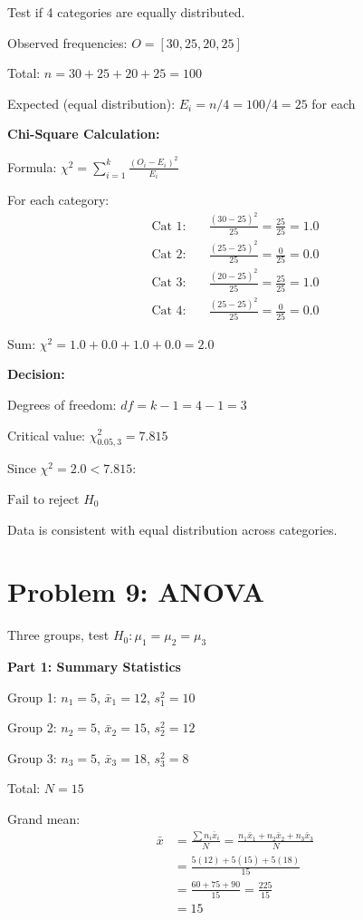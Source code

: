 \documentclass[10pt,twocolumn]{article}
\begin{document}
Test if 4 categories are equally distributed.

Observed frequencies: $O = [30, 25, 20, 25]$

Total: $n = 30+25+20+25 = 100$

Expected (equal distribution): $E_i = n/4 = 100/4 = 25$ for each

\textbf{Chi-Square Calculation:}

Formula: $\chi^2 = \sum_{i=1}^{k} \frac{(O_i - E_i)^2}{E_i}$

For each category:
\begin{align*}
\text{Cat 1:} \quad &\frac{(30-25)^2}{25} = \frac{25}{25} = 1.0 \\
\text{Cat 2:} \quad &\frac{(25-25)^2}{25} = \frac{0}{25} = 0.0 \\
\text{Cat 3:} \quad &\frac{(20-25)^2}{25} = \frac{25}{25} = 1.0 \\
\text{Cat 4:} \quad &\frac{(25-25)^2}{25} = \frac{0}{25} = 0.0
\end{align*}

Sum: $\chi^2 = 1.0 + 0.0 + 1.0 + 0.0 = \boxed{2.0}$

\textbf{Decision:}

Degrees of freedom: $df = k - 1 = 4 - 1 = 3$

Critical value: $\chi^2_{0.05,3} = 7.815$

Since $\chi^2 = 2.0 < 7.815$:

$\boxed{\text{Fail to reject } H_0}$

Data is consistent with equal distribution across categories.

\section*{Problem 9: ANOVA}

Three groups, test $H_0: \mu_1 = \mu_2 = \mu_3$

\textbf{Part 1: Summary Statistics}

Group 1: $n_1=5$, $\bar{x}_1=12$, $s_1^2=10$

Group 2: $n_2=5$, $\bar{x}_2=15$, $s_2^2=12$

Group 3: $n_3=5$, $\bar{x}_3=18$, $s_3^2=8$

Total: $N = 15$

Grand mean:
\begin{align*}
\bar{x} &= \frac{\sum n_i\bar{x}_i}{N} = \frac{n_1\bar{x}_1+n_2\bar{x}_2+n_3\bar{x}_3}{N} \\
&= \frac{5(12)+5(15)+5(18)}{15} \\
&= \frac{60+75+90}{15} = \frac{225}{15} \\
&= \boxed{15}
\end{align*}
\end{document}

